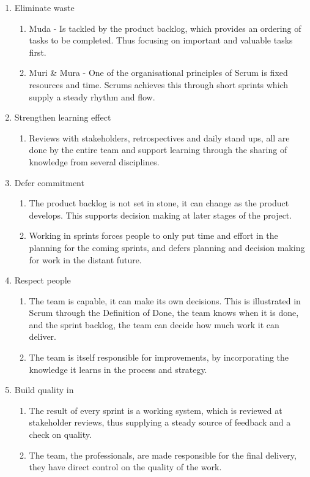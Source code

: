 \begin{enumerate}
    \item Eliminate waste
    \begin{enumerate}
        \item Muda - Is tackled by the product backlog, which provides an ordering of tasks to be completed. Thus focusing on important and valuable tasks first.
        \item Muri \& Mura - One of the organisational principles of Scrum is fixed resources and time. Scrums achieves this through short sprints which supply a steady rhythm and flow. 
    \end{enumerate}
    \item Strengthen learning effect
    \begin{enumerate}
        \item Reviews with stakeholders, retrospectives and daily stand ups, all are done by the entire team and support learning through the sharing of knowledge from several disciplines.
    \end{enumerate}
    \item Defer commitment
    \begin{enumerate}
        \item The product backlog is not set in stone, it can change as the product develops. This supports decision making at later stages of the project.
        \item Working in sprints forces people to only put time and effort in the planning for the coming sprints, and defers planning and decision making for work in the distant future.
    \end{enumerate}
    \item Respect people
    \begin{enumerate}
        \item The team is capable, it can make its own decisions. This is illustrated in Scrum through the Definition of Done, the team knows when it is done, and the sprint backlog, the team can decide how much work it can deliver. 
        \item The team is itself responsible for improvements, by incorporating the knowledge it learns in the process and strategy.
    \end{enumerate}
    \item Build quality in
    \begin{enumerate}
        \item The result of every sprint is a working system, which is reviewed at stakeholder reviews, thus supplying a steady source of feedback and a check on quality. \item The team, the professionals, are made responsible for the final delivery, they have direct control on the quality of the work.

\end{enumerate}
\end{enumerate}
